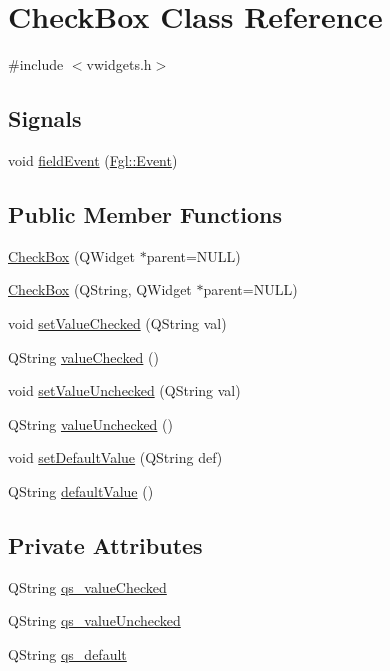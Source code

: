 \hypertarget{classCheckBox}{
\section{CheckBox Class Reference}
\label{classCheckBox}
}


{\ttfamily \#include $<$vwidgets.h$>$}

\subsection*{Signals}
\begin{DoxyCompactItemize}
\item 
void \hyperlink{classCheckBox_ab7701c08638ff1fcdbda78bd9da08467}{fieldEvent} (\hyperlink{structFgl_1_1Event}{Fgl::Event})
\end{DoxyCompactItemize}
\subsection*{Public Member Functions}
\begin{DoxyCompactItemize}
\item 
\hyperlink{classCheckBox_a1142cc2820e6e1bd93a1c4a971774c34}{CheckBox} (QWidget $\ast$parent=NULL)
\item 
\hyperlink{classCheckBox_ab7c41072f6ba5f744f942b1962a14869}{CheckBox} (QString, QWidget $\ast$parent=NULL)
\item 
void \hyperlink{classCheckBox_aeda5bfde9248d30788390239d241ee69}{setValueChecked} (QString val)
\item 
QString \hyperlink{classCheckBox_a33e6aa1e2b208c4ad636cfe2652afd56}{valueChecked} ()
\item 
void \hyperlink{classCheckBox_a2ee08e32b608ef954f9cdaa7366a8285}{setValueUnchecked} (QString val)
\item 
QString \hyperlink{classCheckBox_a744b38f582ab963ba3a671862e8df5d6}{valueUnchecked} ()
\item 
void \hyperlink{classCheckBox_a1248f1fb389c4b3960ccf32e37b22b57}{setDefaultValue} (QString def)
\item 
QString \hyperlink{classCheckBox_afa6cf2c41430d4ee7b00b0902c12c7e8}{defaultValue} ()
\end{DoxyCompactItemize}
\subsection*{Private Attributes}
\begin{DoxyCompactItemize}
\item 
QString \hyperlink{classCheckBox_a44ec1015259303e99d56c04fe5841e39}{qs\_\-valueChecked}
\item 
QString \hyperlink{classCheckBox_aad5473314931f69256aabde7f44c473a}{qs\_\-valueUnchecked}
\item 
QString \hyperlink{classCheckBox_ac21bfd62bb71d0dd23f72e6ef70293d6}{qs\_\-default}
\end{DoxyCompactItemize}


